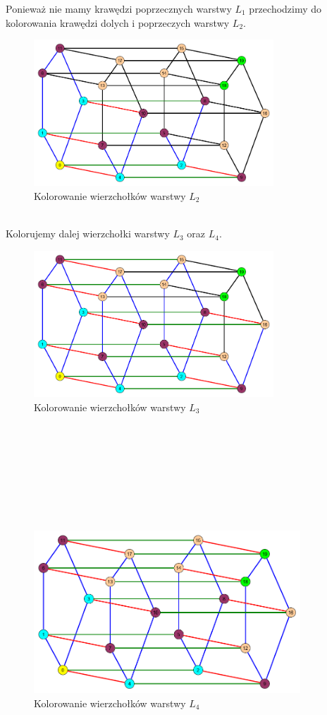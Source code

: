 \documentclass[12pt,a4paper,titlepage]{article}
\newcommand\tab[1][1cm]{\hspace*{#1}}
\begin{document}
Ponieważ nie mamy krawędzi poprzecznych warstwy $L_1$ przechodzimy do kolorowania krawędzi dolych i poprzeczych warstwy $L_2$.
\begin{figure}[h]
\centering
\includegraphics[width = 9cm]{kol3.png}
\caption{Kolorowanie wierzchołków warstwy $L_2$}
\end{figure}
\\
\tab[0.6cm]Kolorujemy dalej wierzchołki warstwy $L_3$ oraz $L_4$.
\begin{figure}[h]
\centering
\includegraphics[width = 9cm]{kol4.png}
\caption{Kolorowanie wierzchołków warstwy $L_3$}
\end{figure}
\\
\\
\\
\\
\\
\\
\\
\begin{figure}[h]
\centering
\includegraphics[width = 10cm]{kol5.png}
\caption{Kolorowanie wierzchołków warstwy $L_4$}
\end{figure}
\end{document}
